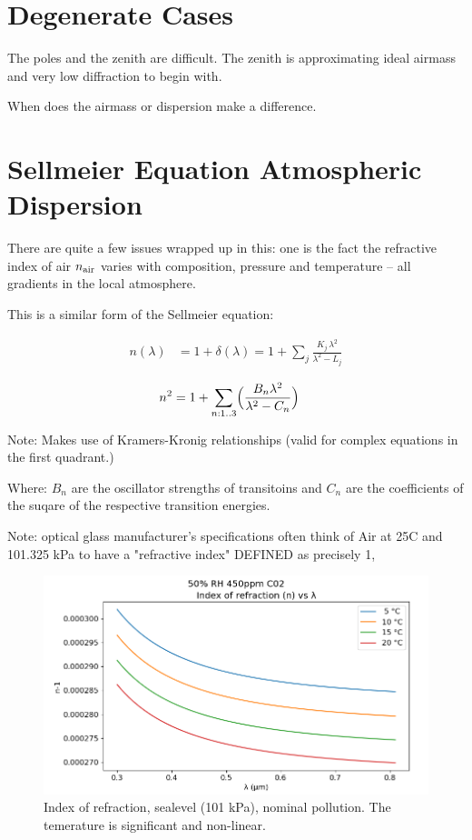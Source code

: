\documentclass[letter,11pt,oneside]{article}
\begin{document}
\section{Degenerate Cases}

The poles and the zenith are difficult. The zenith is approximating
ideal airmass and very low diffraction to begin with.

When does the airmass or dispersion make a difference.

\section{Sellmeier Equation Atmospheric Dispersion}

There are quite a few issues wrapped up in this: one
is the fact the refractive index of air $n_{\rm{air}}$ varies
with composition, pressure and temperature -- all gradients
in the local atmosphere.

This is a similar form of the Sellmeier equation:



\begin{align}
n(\lambda) &= 1+\delta(\lambda) = 1+\sum_j\frac{K_j\,\lambda^2}{\lambda^2 - L_j}
\end{align}

\begin{align}
n^{2} &= 1+\sum_{n:1..3}\Bigr ( \frac{B_{n}\lambda^{2}}{\lambda^{2}-C_{n}} \Bigl )
\end{align}

Note: Makes use of Kramers-Kronig relationships (valid for complex
equations in the first quadrant.)

Where: $B_{n}$ are the oscillator strengths of transitoins and $C_{n}$ are
the coefficients of the suqare of the respective transition energies. 

Note: optical glass manufacturer's specifications often think of Air
at 25C and 101.325 kPa to have a "refractive index" DEFINED as precisely 1,


\begin{figure}[h!]
\centering
\includegraphics[width=\textwidth]{images/IndexRefraction_by_temperature.png}
\caption{Index of refraction, sealevel (101 kPa), nominal pollution. The temerature
is significant and non-linear.} %
\label{figure:}
\end{figure}
\end{document}
